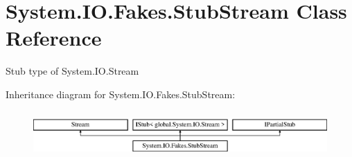 \hypertarget{class_system_1_1_i_o_1_1_fakes_1_1_stub_stream}{\section{System.\-I\-O.\-Fakes.\-Stub\-Stream Class Reference}
\label{class_system_1_1_i_o_1_1_fakes_1_1_stub_stream}
}


Stub type of System.\-I\-O.\-Stream 


Inheritance diagram for System.\-I\-O.\-Fakes.\-Stub\-Stream\-:\begin{figure}[H]
\begin{center}
\leavevmode
\includegraphics[height=1.777778cm]{class_system_1_1_i_o_1_1_fakes_1_1_stub_stream}
\end{center}
\end{figure}
